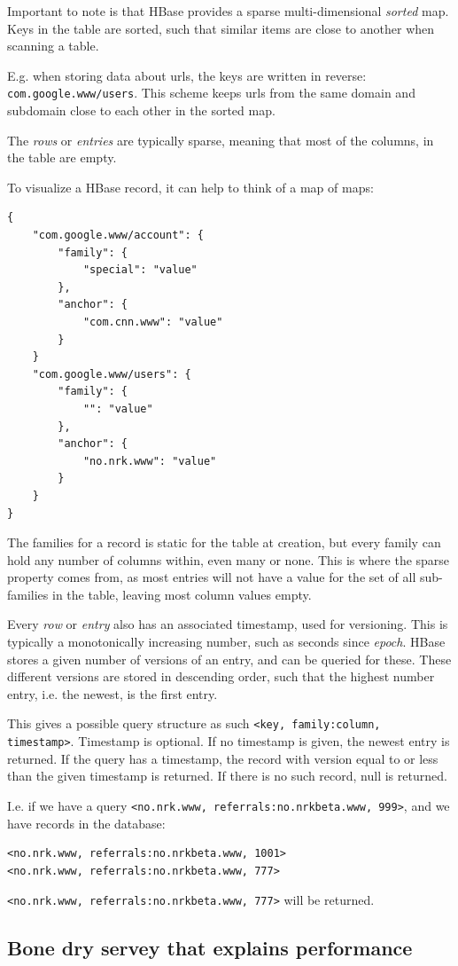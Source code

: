 Important to note is that HBase provides a sparse multi-dimensional \emph{sorted} map.
Keys in the table are sorted, such that similar items are close to another when scanning a table.

E.g. when storing data about urls, the keys are written in reverse: \texttt{com.google.www/users}. This scheme keeps urls from the same domain and subdomain close to each other in the sorted map.

The \emph{rows} or \emph{entries} are typically sparse, meaning that most of the columns, in the table are empty.

To visualize a HBase record, it can help to think of a map of maps:

\begin{lstlisting}
{
	"com.google.www/account": {
		"family": {
			"special": "value"
		},
		"anchor": {
			"com.cnn.www": "value"
		}
	}
	"com.google.www/users": {
		"family": {
			"": "value"
		},
		"anchor": {
			"no.nrk.www": "value"
		}
	}
}
\end{lstlisting}

The families for a record is static for the table at creation, but every family can hold any number of columns within, even many or none.
This is where the sparse property comes from, as most entries will not have a value for the set of all sub-families in the table, leaving most column values empty.

Every \emph{row} or \emph{entry} also has an associated timestamp, used for versioning. This is typically a monotonically increasing number, such as seconds since \emph{epoch}. HBase stores a given number of versions of an entry, and can be queried for these. 
These different versions are stored in descending order, such that the highest number entry, i.e. the newest, is the first entry.

This gives a possible query structure as such \texttt{<key, family:column, timestamp>}. Timestamp is optional. If no timestamp is given, the newest entry is returned. 
If the query has a timestamp, the record with version equal to or less than the given timestamp is returned. If there is no such record, null is returned.

I.e. if we have a query \texttt{<no.nrk.www, referrals:no.nrkbeta.www, 999>}, and we have records in the database:
\begin{lstlisting}
<no.nrk.www, referrals:no.nrkbeta.www, 1001>
<no.nrk.www, referrals:no.nrkbeta.www, 777>
\end{lstlisting}
\texttt{<no.nrk.www, referrals:no.nrkbeta.www, 777>} will be returned.

\subsection{Bone dry servey that explains performance}
